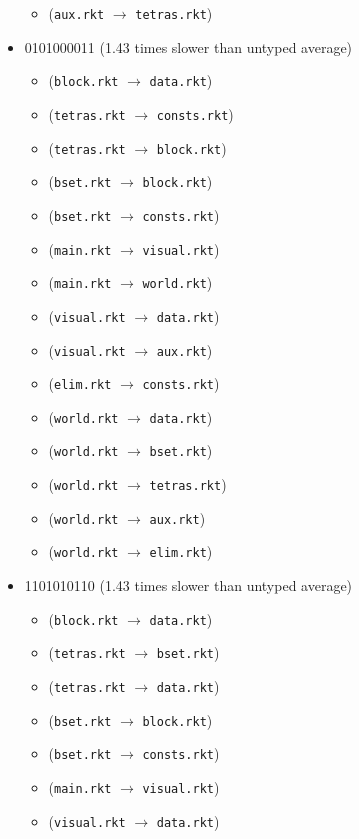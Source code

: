 \documentclass{article}
\newcommand{\mono}[1]{\texttt{#1}}
\begin{document}
\begin{itemize}
\begin{itemize}
  \item (\mono{aux.rkt} $\rightarrow$ \mono{tetras.rkt})
  \end{itemize}
\item 0101000011 (1.43 times slower than untyped average)
  \begin{itemize}
  \item (\mono{block.rkt} $\rightarrow$ \mono{data.rkt})
  \item (\mono{tetras.rkt} $\rightarrow$ \mono{consts.rkt})
  \item (\mono{tetras.rkt} $\rightarrow$ \mono{block.rkt})
  \item (\mono{bset.rkt} $\rightarrow$ \mono{block.rkt})
  \item (\mono{bset.rkt} $\rightarrow$ \mono{consts.rkt})
  \item (\mono{main.rkt} $\rightarrow$ \mono{visual.rkt})
  \item (\mono{main.rkt} $\rightarrow$ \mono{world.rkt})
  \item (\mono{visual.rkt} $\rightarrow$ \mono{data.rkt})
  \item (\mono{visual.rkt} $\rightarrow$ \mono{aux.rkt})
  \item (\mono{elim.rkt} $\rightarrow$ \mono{consts.rkt})
  \item (\mono{world.rkt} $\rightarrow$ \mono{data.rkt})
  \item (\mono{world.rkt} $\rightarrow$ \mono{bset.rkt})
  \item (\mono{world.rkt} $\rightarrow$ \mono{tetras.rkt})
  \item (\mono{world.rkt} $\rightarrow$ \mono{aux.rkt})
  \item (\mono{world.rkt} $\rightarrow$ \mono{elim.rkt})
  \end{itemize}
\item 1101010110 (1.43 times slower than untyped average)
  \begin{itemize}
  \item (\mono{block.rkt} $\rightarrow$ \mono{data.rkt})
  \item (\mono{tetras.rkt} $\rightarrow$ \mono{bset.rkt})
  \item (\mono{tetras.rkt} $\rightarrow$ \mono{data.rkt})
  \item (\mono{bset.rkt} $\rightarrow$ \mono{block.rkt})
  \item (\mono{bset.rkt} $\rightarrow$ \mono{consts.rkt})
  \item (\mono{main.rkt} $\rightarrow$ \mono{visual.rkt})
  \item (\mono{visual.rkt} $\rightarrow$ \mono{data.rkt})

\end{itemize}
\end{itemize}
\end{document}
